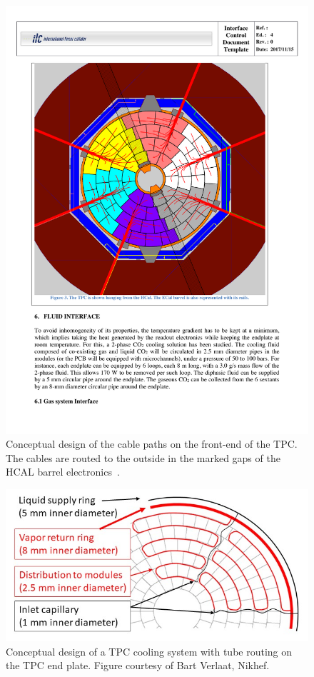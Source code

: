 \begin{figure}[h!]
    \centering
    \includegraphics[width=0.6\hsize]{Integration/fig/TPC_Cables.pdf}
    \caption{Conceptual design of the cable paths on the front-end of the TPC. The cables are routed to the outside in the marked gaps of the HCAL barrel electronics~\cite{ild:bib:TPC_ICD}.}
    \label{ILD:fig:tpc_cables}
\end{figure}
\begin{figure}[h!]
    \centering
    \includegraphics[width=1.0\hsize]{Integration/fig/TPC_Cooling_v2.png}
    \caption{Conceptual design of a TPC cooling system with tube routing on the TPC end plate. Figure courtesy of Bart Verlaat, Nikhef.}
    \label{ILD:fig:tpc_cooling}
\end{figure}


